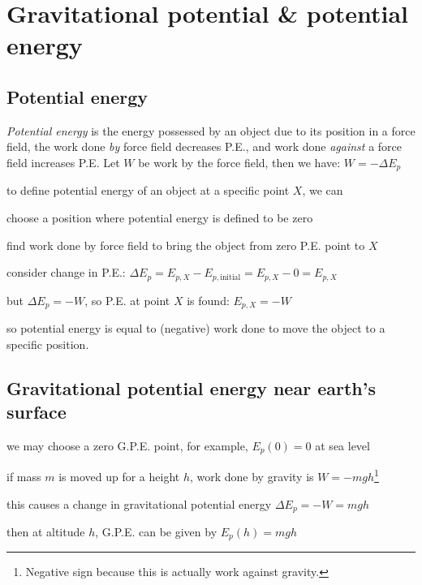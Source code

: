 \documentclass[a4paper,12pt]{book}
\newcounter{example}[chapter]
\newcommand{\tcbhighmath}[1]{\boxed{#1}}
\begin{document}
\section{Gravitational potential \& potential energy}

\subsection{Potential energy}

\emph{Potential energy} is the energy possessed by an object due to its position in a force field, the work done \emph{by} force field decreases P.E., and work done \emph{against} a force field increases P.E. Let $W$ be work by the force field, then we have: $\tcbhighmath{W=-\Delta E_p}$


to define potential energy of an object at a specific point $X$, we can

\begin{compactenum}
	\item[(1)] choose a position where potential energy is defined to be zero
	
	\item[(2)] find work done by force field to bring the object from zero P.E. point to $X$
	
	\item[(3)] consider change in P.E.: $\Delta E_p = E_{p,X} - E_{p,\text{initial}} = E_{p,X} - 0 = E_{p,X}$
	
	but $\Delta E_p = -W$, so P.E. at point $X$ is found: $E_{p,X} = -W$
	
\end{compactenum}

so potential energy is equal to (negative) work done to move the object to a specific position.

\subsection*{Gravitational potential energy near earth's surface}

we may choose a zero G.P.E. point, for example, $E_p(0) = 0$ at sea level

if mass $m$ is moved up for a height $h$, work done by gravity is $W=-mgh$\footnote{Negative sign because this is actually work against gravity.}

this causes a change in gravitational potential energy $\Delta E_p=-W=mg h$

then at altitude $h$, G.P.E. can be given by $E_p(h)=mgh$
\end{document}
